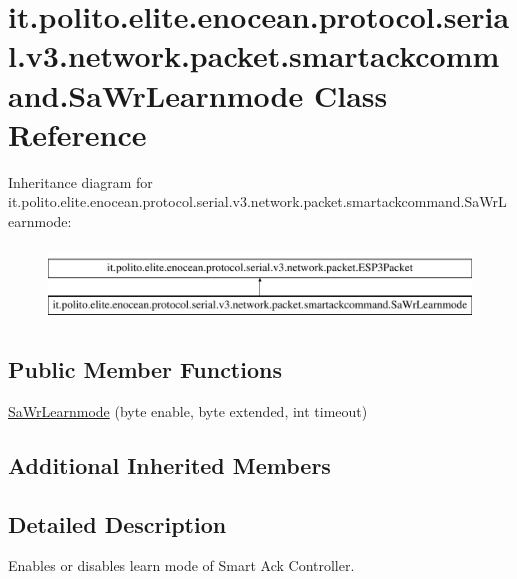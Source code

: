 \hypertarget{classit_1_1polito_1_1elite_1_1enocean_1_1protocol_1_1serial_1_1v3_1_1network_1_1packet_1_1smartackcommand_1_1_sa_wr_learnmode}{}\section{it.\+polito.\+elite.\+enocean.\+protocol.\+serial.\+v3.\+network.\+packet.\+smartackcommand.\+Sa\+Wr\+Learnmode Class Reference}
\label{classit_1_1polito_1_1elite_1_1enocean_1_1protocol_1_1serial_1_1v3_1_1network_1_1packet_1_1smartackcommand_1_1_sa_wr_learnmode}
Inheritance diagram for it.\+polito.\+elite.\+enocean.\+protocol.\+serial.\+v3.\+network.\+packet.\+smartackcommand.\+Sa\+Wr\+Learnmode\+:\begin{figure}[H]
\begin{center}
\leavevmode
\includegraphics[height=2.000000cm]{classit_1_1polito_1_1elite_1_1enocean_1_1protocol_1_1serial_1_1v3_1_1network_1_1packet_1_1smartackcommand_1_1_sa_wr_learnmode}
\end{center}
\end{figure}
\subsection*{Public Member Functions}
\begin{DoxyCompactItemize}
\item 
\hyperlink{classit_1_1polito_1_1elite_1_1enocean_1_1protocol_1_1serial_1_1v3_1_1network_1_1packet_1_1smartackcommand_1_1_sa_wr_learnmode_aa933acd67ac596449a799f05372a6e78}{Sa\+Wr\+Learnmode} (byte enable, byte extended, int timeout)
\end{DoxyCompactItemize}
\subsection*{Additional Inherited Members}


\subsection{Detailed Description}
Enables or disables learn mode of Smart Ack Controller.

